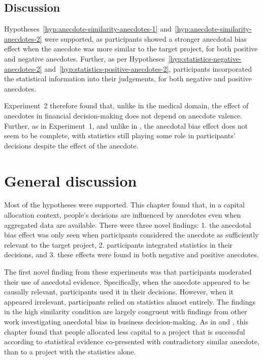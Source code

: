 \documentclass[a4paper, nobind, dvipsnames]{templates/ociamthesis}
\theoremstyle{definition}
\theoremstyle{definition}
\theoremstyle{definition}
\theoremstyle{definition}
\theoremstyle{remark}
\begin{document}
\subsection{Discussion}

Hypotheses~\ref{hyp:anecdote-similarity-anecdotes-1}
and~\ref{hyp:anecdote-similarity-anecdotes-2} were supported, as participants
showed a stronger anecdotal bias effect when the anecdote was more similar to
the target project, for both positive and negative anecdotes. Further, as per
Hypotheses~\ref{hyp:statistics-negative-anecdotes-2}
and~\ref{hyp:statistics-positive-anecdotes-2}, participants incorporated the
statistical information into their judgements, for both negative and positive
anecdotes.

Experiment~2 therefore found that, unlike in the medical domain, the effect of
anecdotes in financial decision-making does not depend on anecdote valence.
Further, as in Experiment~1, and unlike in \textcite{wainberg2013}, the anecdotal bias
effect does not seem to be complete, with statistics still playing some role in
participants' decisions despite the effect of the anecdote.

\section{General discussion}

Most of the hypotheses were supported. This chapter found that, in a capital
allocation context, people's decisions are influenced by anecdotes even when
aggregated data are available. There were three novel findings: 1. the anecdotal
bias effect was only seen when participants considered the anecdote as
sufficiently relevant to the target project, 2. participants integrated
statistics in their decisions, and 3. these effects were found in both negative
and positive anecdotes.

The first novel finding from these experiments was that participants moderated
their use of anecdotal evidence. Specifically, when the anecdote appeared to be
causally relevant, participants used it in their decisions. However, when it
appeared irrelevant, participants relied on statistics almost entirely. The
findings in the high similarity condition are largely congruent with findings
from other work investigating anecdotal bias in business decision-making. As in
\textcite{wainberg2013} and \textcite{wainberg2018}, this chapter found that people allocated less
capital to a project that is successful according to statistical evidence
co-presented with contradictory similar anecdote, than to a project with the
statistics alone.
\end{document}
